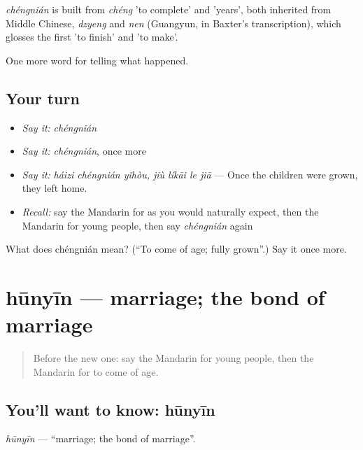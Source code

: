 \begin{cousinweb}
\emph{chéngnián} is built from \emph{chéng} 'to complete' and  'years', both inherited from Middle Chinese, \emph{dzyeng} and \emph{nen} (Guangyun, in Baxter's transcription), which glosses the first 'to finish' and 'to make'.
\end{cousinweb}

\begin{grammarlens}[title={What you've built}]
One more word for telling what happened.
\end{grammarlens}

\subsection*{Your turn}
\begin{itemize}
\raggedright
  \item \emph{Say it:} \emph{chéngnián}
  \item \emph{Say it:} \emph{chéngnián}, once more
  \item \emph{Say it:} \emph{háizi chéngnián yǐhòu, jiù líkāi le jiā} — Once the children were grown, they left home.
  \item \emph{Recall:} say the Mandarin for as you would naturally expect, then the Mandarin for young people, then say \emph{chéngnián} again
\end{itemize}

\begin{tcolorbox}[breakable,colback=teal!4,colframe=teal!35!black,title={Before you move on}]
What does chéngnián mean? (\textquotedblleft{}To come of age; fully grown\textquotedblright{}.) Say it once more.
\end{tcolorbox}
\section[hūnyīn]{hūnyīn — marriage; the bond of marriage}

\label{lesson:ZH-C317-hunyin}



\begin{quote}
Before the new one: say the Mandarin for young people, then the Mandarin for to come of age.
\end{quote}

\subsection*{You'll want to know: hūnyīn}
\emph{hūnyīn} — \textquotedblleft{}marriage; the bond of marriage\textquotedblright{}.

